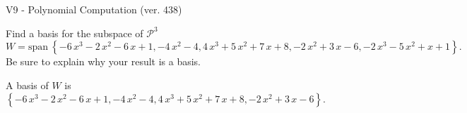 \begin{exercise}
  \begin{exerciseTitle}V9 - Polynomial Computation (ver. 438)\end{exerciseTitle}
  \begin{exerciseStatement}
    Find a basis for the subspace of \(\mathcal{P}^3\) 
\[W=\mathrm{span}\ \left\{-6 \, x^{3} - 2 \, x^{2} - 6 \, x + 1 , -4 \, x^{2} - 4 , 4 \, x^{3} + 5 \, x^{2} + 7 \, x + 8 , -2 \, x^{2} + 3 \, x - 6 , -2 \, x^{3} - 5 \, x^{2} + x + 1\right\}.\]
 Be sure to explain why your result is a basis.


  \end{exerciseStatement}
  \begin{exerciseAnswer}
   A basis of \(W\) is  \(\left\{-6 \, x^{3} - 2 \, x^{2} - 6 \, x + 1 , -4 \, x^{2} - 4 , 4 \, x^{3} + 5 \, x^{2} + 7 \, x + 8 , -2 \, x^{2} + 3 \, x - 6\right\}\).
  


  \end{exerciseAnswer}
\end{exercise}